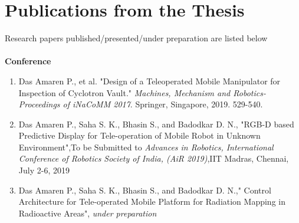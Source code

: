 \chapter*{Publications from the Thesis}
Research papers published/presented/under preparation are listed below\\
 \\
 \textbf{ Conference}
\begin{enumerate}
\item  Das Amaren P., et al. "Design of a Teleoperated Mobile Manipulator for Inspection of Cyclotron Vault."\textit{ Machines, Mechanism and Robotics-Proceedings of iNaCoMM 2017}. Springer, Singapore, 2019. 529-540.

\item Das Amaren P., Saha S. K., Bhasin S., and Badodkar D. N., "RGB-D based Predictive Display for Tele-operation of Mobile Robot in Unknown Environment",To be Submitted to\textit{ Advances in Robotics, International Conference of Robotics Society of India, (AiR 2019)},IIT Madras, Chennai, July 2-6, 2019

\item  Das Amaren P., Saha S. K., Bhasin S., and Badodkar D. N.," Control Architecture for Tele-operated Mobile Platform for Radiation Mapping in Radioactive Areas", \textit{under preparation}
\end{enumerate}